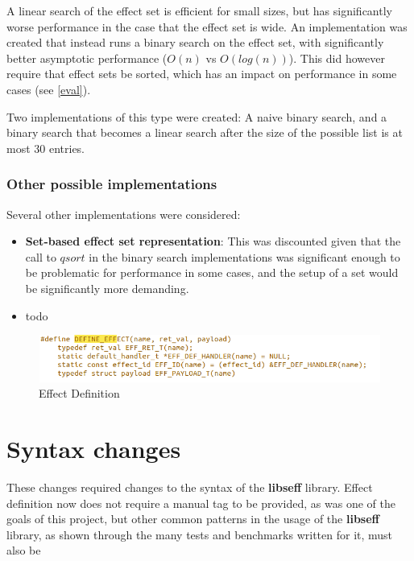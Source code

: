 \documentclass[logo,bsc,singlespacing,parskip,online]{infthesis}
\begin{document}
A linear search of the effect set is efficient for small sizes, but has significantly worse performance in the case that the effect set is wide. An implementation was created that instead runs a binary search on the effect set, with significantly better asymptotic performance ($O(n)$ vs $O(log(n))$). This did however require that effect sets be sorted, which has an impact on performance in some cases (see \cref{eval}).

Two implementations of this type were created: A naive binary search, and a binary search that becomes a linear search after the size of the possible list is at most 30 entries.

\subsubsection{Other possible implementations}

Several other implementations were considered:
\begin{itemize}
    \item \textbf{Set-based effect set representation}: This was discounted given that the call to $qsort$ in the binary search implementations was significant enough to be problematic for performance in some cases, and the setup of a set would be significantly more demanding.
    \item todo%
\end{itemize}

\begin{figure}[ht]
    \centering
    \includegraphics[width=1\linewidth]{defeff.png}
    \caption{Effect Definition}
    \label{fig:joooo}
\end{figure}

\section{Syntax changes} \label{Syntax}

These changes required changes to the syntax of the \textbf{libseff} library. Effect definition now does not require a manual tag to be provided, as was one of the goals of this project, but other common patterns in the usage of the \textbf{libseff} library, as shown through the many tests and benchmarks written for it, must also be 
\end{document}
